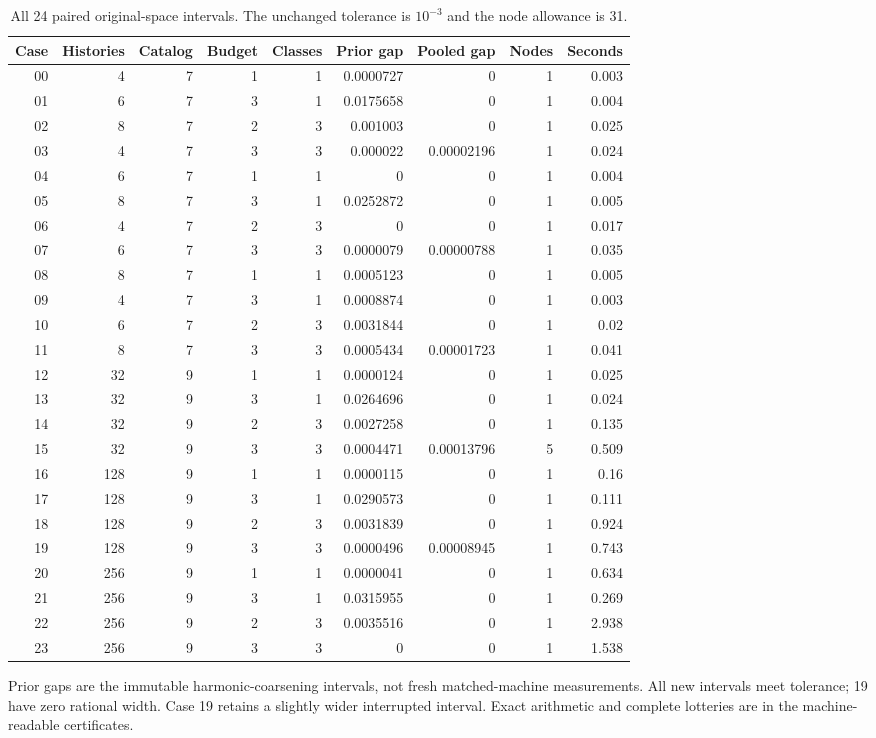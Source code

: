 \begin{table}[p]\centering
\caption{All 24 paired original-space intervals. The unchanged tolerance is $10^{-3}$ and the node allowance is 31.}\label{tab:r49-paired}
\setlength{\tabcolsep}{3pt}
\begin{tabular}{rrrrrrrrr}\toprule
Case & Histories & Catalog & Budget & Classes & Prior gap & Pooled gap & Nodes & Seconds \\
\midrule
00 & 4 & 7 & 1 & 1 & 0.0000727 & 0 & 1 & 0.003 \\
01 & 6 & 7 & 3 & 1 & 0.0175658 & 0 & 1 & 0.004 \\
02 & 8 & 7 & 2 & 3 & 0.001003 & 0 & 1 & 0.025 \\
03 & 4 & 7 & 3 & 3 & 0.000022 & 0.00002196 & 1 & 0.024 \\
04 & 6 & 7 & 1 & 1 & 0 & 0 & 1 & 0.004 \\
05 & 8 & 7 & 3 & 1 & 0.0252872 & 0 & 1 & 0.005 \\
06 & 4 & 7 & 2 & 3 & 0 & 0 & 1 & 0.017 \\
07 & 6 & 7 & 3 & 3 & 0.0000079 & 0.00000788 & 1 & 0.035 \\
08 & 8 & 7 & 1 & 1 & 0.0005123 & 0 & 1 & 0.005 \\
09 & 4 & 7 & 3 & 1 & 0.0008874 & 0 & 1 & 0.003 \\
10 & 6 & 7 & 2 & 3 & 0.0031844 & 0 & 1 & 0.02 \\
11 & 8 & 7 & 3 & 3 & 0.0005434 & 0.00001723 & 1 & 0.041 \\
12 & 32 & 9 & 1 & 1 & 0.0000124 & 0 & 1 & 0.025 \\
13 & 32 & 9 & 3 & 1 & 0.0264696 & 0 & 1 & 0.024 \\
14 & 32 & 9 & 2 & 3 & 0.0027258 & 0 & 1 & 0.135 \\
15 & 32 & 9 & 3 & 3 & 0.0004471 & 0.00013796 & 5 & 0.509 \\
16 & 128 & 9 & 1 & 1 & 0.0000115 & 0 & 1 & 0.16 \\
17 & 128 & 9 & 3 & 1 & 0.0290573 & 0 & 1 & 0.111 \\
18 & 128 & 9 & 2 & 3 & 0.0031839 & 0 & 1 & 0.924 \\
19 & 128 & 9 & 3 & 3 & 0.0000496 & 0.00008945 & 1 & 0.743 \\
20 & 256 & 9 & 1 & 1 & 0.0000041 & 0 & 1 & 0.634 \\
21 & 256 & 9 & 3 & 1 & 0.0315955 & 0 & 1 & 0.269 \\
22 & 256 & 9 & 2 & 3 & 0.0035516 & 0 & 1 & 2.938 \\
23 & 256 & 9 & 3 & 3 & 0 & 0 & 1 & 1.538 \\
\bottomrule\end{tabular}
\par\smallskip\begin{minipage}{.98\textwidth}Prior gaps are the immutable harmonic-coarsening intervals, not fresh matched-machine measurements. All new intervals meet tolerance; 19 have zero rational width. Case 19 retains a slightly wider interrupted interval. Exact arithmetic and complete lotteries are in the machine-readable certificates.\end{minipage}
\end{table}
